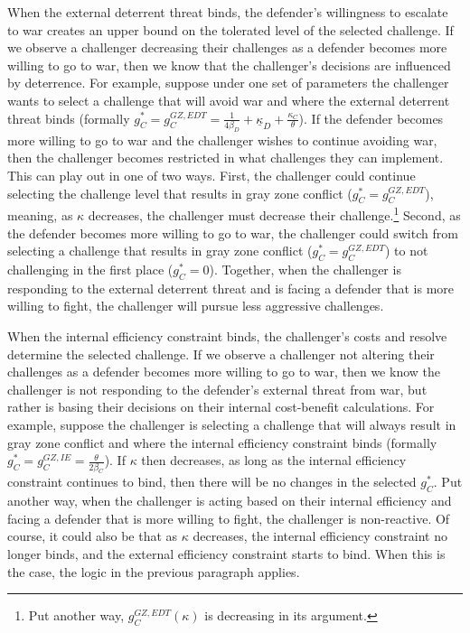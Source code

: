 \documentclass[11pt,letterpaper,pdftex,dvipsnames,table]{article}
\begin{document}
When the external deterrent threat binds, the defender's willingness to escalate to war creates an upper bound on the tolerated level of the selected challenge. If we observe a challenger decreasing their challenges as a defender becomes more willing to go to war, then we know that the challenger's decisions are influenced by deterrence. For example, suppose under one set of parameters the challenger wants to select a challenge that will avoid war and where the external deterrent threat binds (formally $g_{C}^{*}=g_{C}^{GZ,EDT}=\frac{1}{4\beta_{D}}+\underline{\kappa}_{D}+\frac{\kappa_{C}}{\theta}$). If the defender becomes more willing to go to war and the challenger wishes to continue avoiding war, then the challenger becomes restricted in what challenges they can implement. This can play out in one of two ways. First, the challenger could continue selecting the challenge level that results in gray zone conflict ($g_{C}^{*}=g_{C}^{GZ,EDT}$), meaning, as $\kappa$ decreases, the challenger must decrease their challenge.\footnote{Put another way, $g_{C}^{GZ,EDT}(\kappa)$ is decreasing in its argument.} Second, as the defender becomes more willing to go to war, the challenger could switch from selecting a challenge that results in gray zone conflict ($g_{C}^{*}=g_{C}^{GZ,EDT}$) to not challenging in the first place ($g_{C}^{*}=0$). Together, when the challenger is responding to the external deterrent threat and is facing a defender that is more willing to fight, the challenger will pursue less aggressive challenges. 

When the internal efficiency constraint binds, the challenger's costs and resolve determine the selected challenge. If we observe a challenger not altering their challenges as a defender becomes more willing to go to war, then we know the challenger is not responding to the defender's external threat from war, but rather is basing their decisions on their internal cost-benefit calculations. For example, suppose the challenger is selecting a challenge that will always result in gray zone conflict and where the internal efficiency constraint binds (formally $g_{C}^{*}=g_{C}^{GZ,IE}=\frac{\theta}{2\beta_{C}}$). If $\kappa$ then decreases, as long as the internal efficiency constraint continues to bind, then there will be no changes in the selected $g_{C}^{*}$. Put another way, when the challenger is acting based on their internal efficiency and facing a defender that is more willing to fight, the challenger is non-reactive. Of course, it could also be that as $\kappa$ decreases, the internal efficiency constraint no longer binds, and the external efficiency constraint starts to bind. When this is the case, the logic in the previous paragraph applies.
\end{document}
